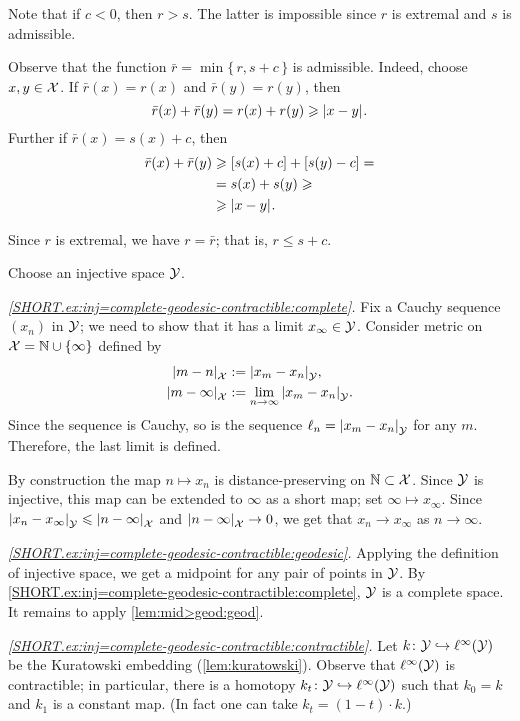 Note that if $c<0$, then $r>s$.
The latter is impossible since $r$ is extremal and $s$ is admissible.

Observe that the function $\bar r=\min\{\,r,s+c\,\}$ is admissible.
Indeed, choose $x,y\in \mathcal{X}$.
If $\bar r(x)=r(x)$ and $\bar r(y)=r(y)$, then 
\[\bar r(x)+\bar r(y)=r(x)+ r(y)\ge \dist{x}{y}{}.\]
Further if $\bar r(x)=s(x)+c$, then 
\begin{align*}
\bar r(x)+\bar r(y)&\ge [s(x)+c]+ [s(y)-c]= 
\\
&=s(x)+s(y) \ge 
\\
&\ge\dist{x}{y}{}.
\end{align*}

Since $r$ is extremal, we have $r=\bar r$;
that is, $r\le s+c$.

Choose an injective space $\mathcal{Y}$.

\textit{\ref{SHORT.ex:inj=complete-geodesic-contractible:complete}.}
Fix a Cauchy sequence $(x_n)$ in $\mathcal{Y}$;
we need to show that it has a limit $x_\infty\in \mathcal{Y}$.
Consider metric on $\mathcal{X}=\mathbb{N}\cup\{\infty\}$ defined by 
\begin{align*}
\dist{m}{n}{\spc{X}}&\df\dist{x_m}{x_n}{\spc{Y}},
\\
\dist{m}{\infty}{\spc{X}}&\df\lim_{n\to\infty}\dist{x_m}{x_n}{\spc{Y}}.
\end{align*}
Since the sequence is Cauchy, so is the sequence $\ell_n=\dist{x_m}{x_n}{\spc{Y}}$ for any $m$.
Therefore, the last limit is defined.

By construction the map $n\mapsto x_n$ is distance-preserving on $\mathbb{N}\subset \mathcal{X}$.
Since $\mathcal{Y}$ is injective, this map can be extended to $\infty$ as a short map; set $\infty\mapsto x_\infty$.
Since $\dist{x_n}{x_\infty}{\spc{Y}}\le \dist{n}{\infty}{\spc{X}}$ 
and $\dist{n}{\infty}{\spc{X}}\to 0$, we get that
$x_n\to x_\infty$ as $n\to\infty$.

\textit{\ref{SHORT.ex:inj=complete-geodesic-contractible:geodesic}.}
Applying the definition of injective space, we get a midpoint for any pair of points in $\mathcal{Y}$.
By \ref{SHORT.ex:inj=complete-geodesic-contractible:complete},
$\mathcal{Y}$ is a complete space.
It remains to apply \ref{lem:mid>geod:geod}.

\textit{\ref{SHORT.ex:inj=complete-geodesic-contractible:contractible}.}
Let $k\colon\mathcal{Y}\hookrightarrow \ell^\infty(\mathcal{Y})$ be the Kuratowski embedding (\ref{lem:kuratowski}).
Observe that $\ell^\infty(\mathcal{Y})$ is contractible;
in particular, there is a homotopy $k_t\colon\mathcal{Y}\hookrightarrow \ell^\infty(\mathcal{Y})$ such that $k_0=k$ and $k_1$ is a constant map.
(In fact one can take $k_t=(1-t)\cdot k$.)

